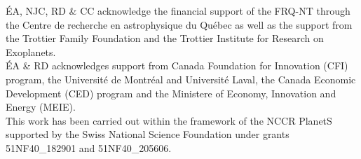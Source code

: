\author{\'Etienne Artigau
\and Neil J. Cook
\and Lo\"ic Albert
\and Ren\'e Doyon
\and Charles Cadieux}



\'EA, NJC, RD \& CC acknowledge the financial support of the FRQ-NT through the Centre de recherche en astrophysique du Qu\'ebec as well as the support from the Trottier Family Foundation and the Trottier Institute for Research on Exoplanets.\\
\'EA \& RD acknowledges support from Canada Foundation for Innovation (CFI) program, the Universit\'e de Montr\'eal and Universit\'e Laval, the Canada Economic Development (CED) program and the Ministere of Economy, Innovation and Energy (MEIE).\\
This work has been carried out within the framework of the NCCR PlanetS supported by the Swiss National Science Foundation under grants 51NF40\_182901 and 51NF40\_205606.